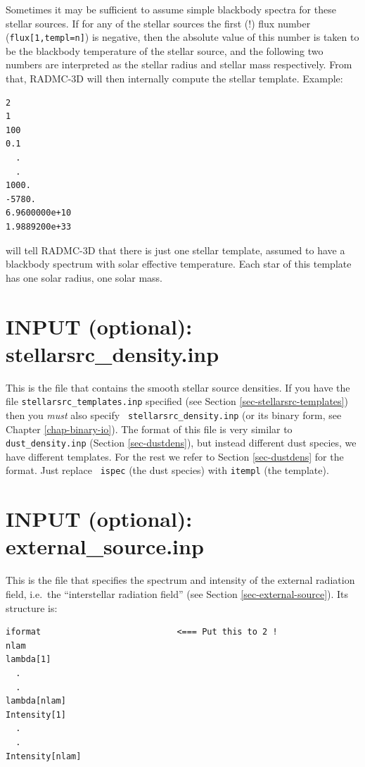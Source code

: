\documentclass{report}
\newenvironment{asciibox}%
  {\begin{list}{}{%
    \setlength{\topsep}{0.5em}%
    \setlength{\parskip}{0em}%
    \setlength{\parsep}{0em}%
    \setlength{\itemsep}{0em}%
    \setlength{\rightmargin}{0em}%
    \setlength{\leftmargin}{3.0em}%
    \setlength{\labelsep}{1em}%
    \setlength{\labelwidth}{2em}%
  }\normalfont\footnotesize\item}
  {\end{list}}
\begin{document}
\noindent Sometimes it may be sufficient to assume simple blackbody spectra
for these stellar sources. If for any of the stellar sources the first (!)
flux number ({\small\tt flux[1,templ=n]}) is negative, then the absolute
value of this number is taken to be the blackbody temperature of the stellar
source, and the following two numbers are interpreted as the stellar radius
and stellar mass respectively. From that, RADMC-3D will then internally
compute the stellar template. Example:
\begin{asciibox}\begin{verbatim}
2
1            
100
0.1
  .
  .
1000.
-5780.
6.9600000e+10   
1.9889200e+33
\end{verbatim}\end{asciibox}
will tell RADMC-3D that there is just one stellar template, assumed to have
a blackbody spectrum with solar effective temperature. Each star of this
template has one solar radius, one solar mass.



\section{INPUT (optional): stellarsrc\_density.inp}
\label{sec-stellarsrc-density}
%
This is the file that contains the smooth stellar source densities. If you
have the file {\small\tt stellarsrc\_templates.inp} specified (see Section
\ref{sec-stellarsrc-templates}) then you {\em must} also specify {\small\tt
  stellarsrc\_density.inp} (or its binary form, see Chapter
\ref{chap-binary-io}).  The format of this file is very similar to
{\small\tt dust\_density.inp} (Section \ref{sec-dustdens}), but instead
different dust species, we have different templates.  For the rest we refer
to Section \ref{sec-dustdens} for the format.  Just replace {\small\tt
  ispec} (the dust species) with {\small\tt itempl} (the template). 


\section{INPUT (optional): external\_source.inp}
\label{sec-ext-src-inp}
This is the file that specifies the spectrum and intensity of the
external radiation field, i.e.\ the ``interstellar radiation field''
(see Section \ref{sec-external-source}). Its structure is:
\begin{asciibox}\begin{verbatim}
iformat                           <=== Put this to 2 !
nlam
lambda[1]
  .
  .
lambda[nlam]
Intensity[1]
  .
  .
Intensity[nlam]
\end{verbatim}\end{asciibox}
\end{document}
